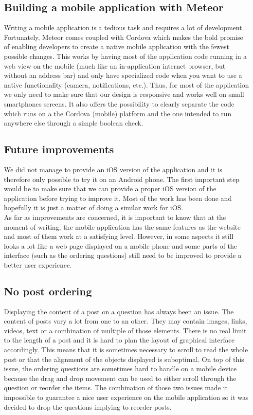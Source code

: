 \subsection{Building a mobile application with Meteor}
Writing a mobile application is a tedious task and requires a lot of development. Fortunately, Meteor comes coupled with Cordova\cite{cordova} which makes the bold promise of enabling developers to create a native mobile application with the fewest possible changes. This works by having most of the application code running in a web view on the mobile (much like an in-application internet browser, but without an address bar) and only have specialized code when you want to use a native functionality (camera, notifications, etc.). Thus, for most of the application we only need to make sure that our design is responsive and works well on small smartphones screens. It also offers the possibility to clearly separate the code which runs on a the Cordova (mobile) platform and the one intended to run anywhere else through a simple boolean check.

\subsection{Future improvements}
We did not manage to provide an iOS version of the application and it is therefore only possible to try it on an Android phone. The first important step would be to make sure that we can provide a proper iOS version of the application before trying to improve it. Most of the work has been done and hopefully it is just a matter of doing a similar work for iOS.\\
As far as improvements are concerned, it is important to know that at the moment of writing, the mobile application has the same features as the website and most of them work at a satisfying level. However, in some aspects it still looks a lot like a web page displayed on a mobile phone and some parts of the interface (such as the ordering questions) still need to be improved to provide a better user experience.


\subsection{No post ordering}
Displaying the content of a post on a question has always been an issue. The content of posts vary a lot from one to an other. They may contain images, links, videos, text or a combination of multiple of those elements. There is no real limit to the length of a post and it is hard to plan the layout of graphical interface accordingly. This means that it is sometimes necessary to scroll to read the whole post or that the alignment of the objects displayed is suboptimal. On top of this issue, the ordering questions are sometimes hard to handle on a mobile device because the drag and drop movement can be used to either scroll through the question or reorder the items. The combination of those two issues made it impossible to guarantee a nice user experience on the mobile application so it was decided to drop the questions implying to reorder posts.
